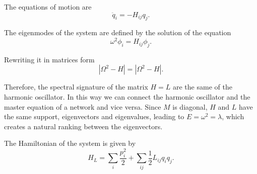 The equations of motion are
\begin{equation}
    \ddot q_i = -H_{ij} q_j.
\end{equation}

The eigenmodes of the system are defined by the solution of the equation 
\begin{equation}
    \omega^2 \phi_i = H_{ij} \phi_j.
\end{equation}

Rewriting it in matrices form
\begin{equation}
    |\Omega^2 - H| = |\Omega^2 - H|.
\end{equation}

Therefore, the spectral signature of the matrix $H = L$ are the same of the harmonic oscillator. In this way we can connect the harmonic oscillator and the master equation of a network and vice versa. Since $M$ is diagonal, $H$ and $L$ have the same support, eigenvectors and eigenvalues, leading to $E = \omega^2 = \lambda$, which creates a natural ranking between the eigenvectors. 

The Hamiltonian of the system is given by
\begin{equation}\label{H_L}
    H_L = \sum_i \frac{p_i^2}{2} + \sum_{ij} \frac{1}{2}L_{ij}q_iq_j.
\end{equation}



